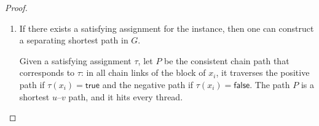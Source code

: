 \begin{proof}
\begin{enumerate}[label=(\alph*)]
    Since $P$ is a shortest $u$--$v$ path, it is a chain path, and since it is separating, it hits every thread.
    By the synchronization property, $P$ is consistent, so it determines a truth assignment $\tau$.
    Moreover, $P$ hits every clause thread, which means that $\tau$ satisfies at least one literal in every clause.
    Thus, $\tau$ is a satisfying assignment for the original formula.

    \item If there exists a satisfying assignment for the \ThreeSAT{} instance, then one can construct a separating shortest path in $G$.

Given a satisfying assignment $\tau$, let $P$ be the consistent chain path that corresponds to $\tau$: in all chain links of the block of $x_i$, it traverses the positive path if $\tau(x_i)=\mathsf{true}$ and the negative path if $\tau(x_i)=\mathsf{false}$.
The path $P$ is a shortest $u$--$v$ path, and it hits every thread.


\end{enumerate}
\end{proof}
